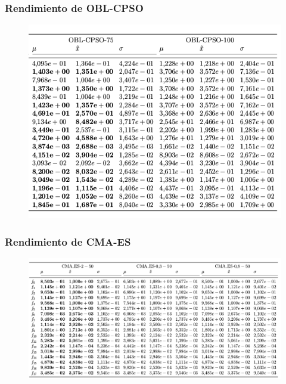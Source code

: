 \begin{frame}
\frametitle{Rendimiento de OBL-CPSO}
\begin{figure}
  \centering
	\includegraphics[scale=0.5]{img/oblcpso2}
\end{figure}
\end{frame}

\begin{frame}
\frametitle{Rendimiento de CMA-ES}
\begin{figure}
  \centering
	\includegraphics[scale=0.3]{img/cmaF}
\end{figure}
\end{frame}

